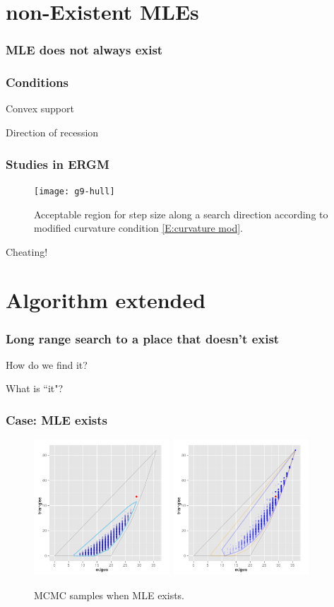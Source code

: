 \documentclass[compress, 9pt]{beamer}
\begin{document}
\section{non-Existent MLEs}
\frame
{
  \frametitle{MLE does not always exist}  


}

\frame
{
  \frametitle{Conditions}  
Convex support

Direction of recession
}

\frame
{
  \frametitle{Studies in ERGM}  
\begin{figure}[h]
\centering
\texttt{[image: g9-hull]}
\caption{Acceptable region for step size 
along a search direction according to modified curvature condition 
\eqref{E:curvature mod}.}
\label{F:g9-hull}
\end{figure}
Cheating!
}

\section{Algorithm extended}
\frame
{
\frametitle{Long range search to a place that doesn't exist}
How do we find it?

What is ``it"?
}

\frame
{
\frametitle{Case: MLE exists}  
\begin{figure}[h]
\centering
\includegraphics[height=2in]{MCsample-far}
\includegraphics[height=2in]{MCsample-MLE}
\caption{MCMC samples when MLE exists.}
\label{F:MCsample-MLE exists}
\end{figure}
}
\end{document}
